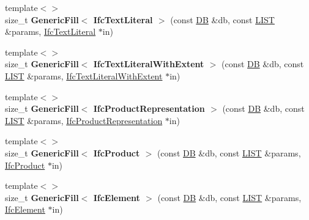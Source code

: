\begin{DoxyCompactItemize}
\item 
\hypertarget{namespace_assimp_1_1_s_t_e_p_ac7bee051c3d957196bc817999140f2a4}{{\footnotesize template$<$$>$ }\\size\+\_\+t {\bfseries Generic\+Fill$<$ Ifc\+Text\+Literal $>$} (const \hyperlink{class_assimp_1_1_s_t_e_p_1_1_d_b}{D\+B} \&db, const \hyperlink{class_assimp_1_1_s_t_e_p_1_1_e_x_p_r_e_s_s_1_1_l_i_s_t}{L\+I\+S\+T} \&params, \hyperlink{struct_assimp_1_1_i_f_c_1_1_ifc_text_literal}{Ifc\+Text\+Literal} $\ast$in)}\label{namespace_assimp_1_1_s_t_e_p_ac7bee051c3d957196bc817999140f2a4}

\item 
\hypertarget{namespace_assimp_1_1_s_t_e_p_a557fabf8bb2314db84399d14f9a37f41}{{\footnotesize template$<$$>$ }\\size\+\_\+t {\bfseries Generic\+Fill$<$ Ifc\+Text\+Literal\+With\+Extent $>$} (const \hyperlink{class_assimp_1_1_s_t_e_p_1_1_d_b}{D\+B} \&db, const \hyperlink{class_assimp_1_1_s_t_e_p_1_1_e_x_p_r_e_s_s_1_1_l_i_s_t}{L\+I\+S\+T} \&params, \hyperlink{struct_assimp_1_1_i_f_c_1_1_ifc_text_literal_with_extent}{Ifc\+Text\+Literal\+With\+Extent} $\ast$in)}\label{namespace_assimp_1_1_s_t_e_p_a557fabf8bb2314db84399d14f9a37f41}

\item 
\hypertarget{namespace_assimp_1_1_s_t_e_p_a7871929e2c208b125ae1796b08d9394c}{{\footnotesize template$<$$>$ }\\size\+\_\+t {\bfseries Generic\+Fill$<$ Ifc\+Product\+Representation $>$} (const \hyperlink{class_assimp_1_1_s_t_e_p_1_1_d_b}{D\+B} \&db, const \hyperlink{class_assimp_1_1_s_t_e_p_1_1_e_x_p_r_e_s_s_1_1_l_i_s_t}{L\+I\+S\+T} \&params, \hyperlink{struct_assimp_1_1_i_f_c_1_1_ifc_product_representation}{Ifc\+Product\+Representation} $\ast$in)}\label{namespace_assimp_1_1_s_t_e_p_a7871929e2c208b125ae1796b08d9394c}

\item 
\hypertarget{namespace_assimp_1_1_s_t_e_p_a1efd6553a10dab023d63f0900191ac94}{{\footnotesize template$<$$>$ }\\size\+\_\+t {\bfseries Generic\+Fill$<$ Ifc\+Product $>$} (const \hyperlink{class_assimp_1_1_s_t_e_p_1_1_d_b}{D\+B} \&db, const \hyperlink{class_assimp_1_1_s_t_e_p_1_1_e_x_p_r_e_s_s_1_1_l_i_s_t}{L\+I\+S\+T} \&params, \hyperlink{struct_assimp_1_1_i_f_c_1_1_ifc_product}{Ifc\+Product} $\ast$in)}\label{namespace_assimp_1_1_s_t_e_p_a1efd6553a10dab023d63f0900191ac94}

\item 
\hypertarget{namespace_assimp_1_1_s_t_e_p_a97f19624fc81e5ec8fcf64bb72f17639}{{\footnotesize template$<$$>$ }\\size\+\_\+t {\bfseries Generic\+Fill$<$ Ifc\+Element $>$} (const \hyperlink{class_assimp_1_1_s_t_e_p_1_1_d_b}{D\+B} \&db, const \hyperlink{class_assimp_1_1_s_t_e_p_1_1_e_x_p_r_e_s_s_1_1_l_i_s_t}{L\+I\+S\+T} \&params, \hyperlink{struct_assimp_1_1_i_f_c_1_1_ifc_element}{Ifc\+Element} $\ast$in)}\label{namespace_assimp_1_1_s_t_e_p_a97f19624fc81e5ec8fcf64bb72f17639}


\end{DoxyCompactItemize}
